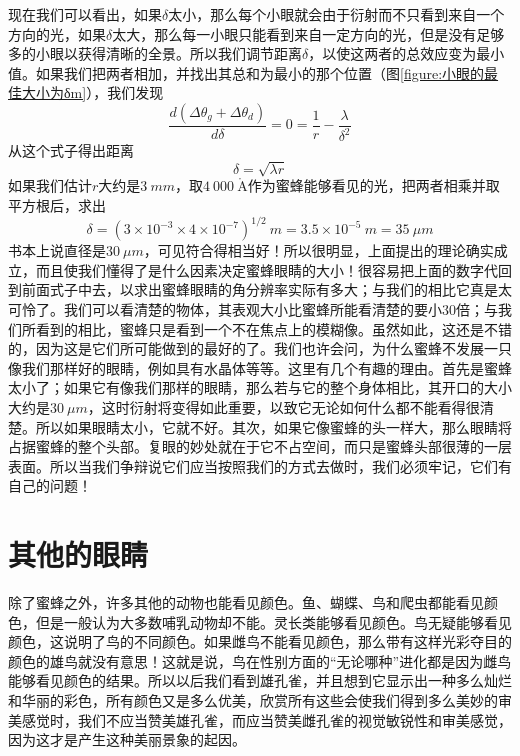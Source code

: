 现在我们可以看出，如果$\delta$太小，那么每个小眼就会由于衍射而不只看到来自一个方向的光，如果$\delta$太大，那么每一小眼只能看到来自一定方向的光，但是没有足够多的小眼以获得清晰的全景。所以我们调节距离$\delta$，以使这两者的总效应变为最小值。如果我们把两者相加，并找出其总和为最小的那个位置（图\ref{figure:小眼的最佳大小为δm}），我们发现
\begin{equation}
    \label{Eq:I:36:3}
    \frac{d(\Delta\theta_g + \Delta\theta_d)}{d\delta} = 0 = \frac{1}{r} - \frac{\lambda}{\delta^2}
\end{equation}
从这个式子得出距离
\begin{equation}
    \label{Eq:I:36:4}
    \delta = \sqrt{\lambda r}
\end{equation}
如果我们估计$r$大约是$3~mm$，取$4~000~\mathring{\text{A}}$作为蜜蜂能够看见的光，把两者相乘并取平方根后，求出
\begin{equation}
    \label{Eq:I:36:5}
    \delta = (3\times 10^{-3} \times 4 \times 10^{-7})^{1/2}~m = 3.5 \times 10^{-5}~m = 35~\mu m
\end{equation}
书本上说直径是$30~\mu m$，可见符合得相当好！所以很明显，上面提出的理论确实成立，而且使我们懂得了是什么因素决定蜜蜂眼睛的大小！很容易把上面的数字代回到前面式子中去，以求出蜜蜂眼睛的角分辨率实际有多大；与我们的相比它真是太可怜了。我们可以看清楚的物体，其表观大小比蜜蜂所能看清楚的要小$30$倍；与我们所看到的相比，蜜蜂只是看到一个不在焦点上的模糊像。虽然如此，这还是不错的，因为这是它们所可能做到的最好的了。我们也许会问，为什么蜜蜂不发展一只像我们那样好的眼睛，例如具有水晶体等等。这里有几个有趣的理由。首先是蜜蜂太小了；如果它有像我们那样的眼睛，那么若与它的整个身体相比，其开口的大小大约是$30~\mu m$，这时衍射将变得如此重要，以致它无论如何什么都不能看得很清楚。所以如果眼睛太小，它就不好。其次，如果它像蜜蜂的头一样大，那么眼睛将占据蜜蜂的整个头部。复眼的妙处就在于它不占空间，而只是蜜蜂头部很薄的一层表面。所以当我们争辩说它们应当按照我们的方式去做时，我们必须牢记，它们有自己的问题！

\section{其他的眼睛}

除了蜜蜂之外，许多其他的动物也能看见颜色。鱼、蝴蝶、鸟和爬虫都能看见颜色，但是一般认为大多数哺乳动物却不能。灵长类能够看见颜色。鸟无疑能够看见颜色，这说明了鸟的不同颜色。如果雌鸟不能看见颜色，那么带有这样光彩夺目的颜色的雄鸟就没有意思！这就是说，鸟在性别方面的“无论哪种”进化都是因为雌鸟能够看见颜色的结果。所以以后我们看到雄孔雀，并且想到它显示出一种多么灿烂和华丽的彩色，所有颜色又是多么优美，欣赏所有这些会使我们得到多么美妙的审美感觉时，我们不应当赞美雄孔雀，而应当赞美雌孔雀的视觉敏锐性和审美感觉，因为这才是产生这种美丽景象的起因。

